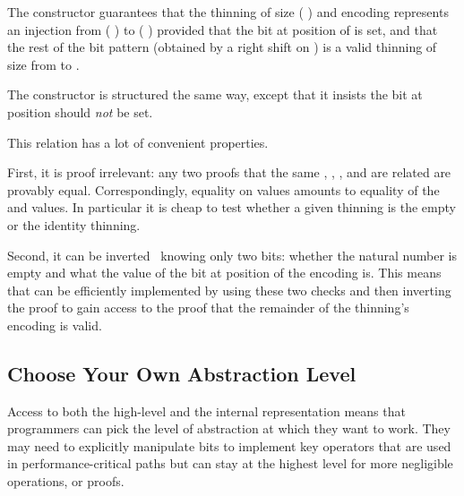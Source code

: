 The  constructor guarantees that the thinning of
size ( ) and encoding 
represents an injection
from ( \IdrisData{:<} )
to ( \IdrisData{:<} )
provided that the bit at position  of 
is set, and that the rest of the bit pattern (obtained by a right shift
on ) is a valid thinning of size  from
 to .

The  constructor is structured the same way, except that
it insists the bit at position  should \emph{not} be set.


This relation has a lot of convenient properties.

First, it is proof irrelevant: any two proofs that the same
, , , and  are
related are provably equal.
%
Correspondingly, equality on  values amounts to equality of
the  and  values. In particular
it is cheap to test whether a given thinning is the empty or the
identity thinning.

Second, it can be inverted~\cite{DBLP:conf/types/CornesT95} knowing only two bits:
whether the natural number is empty and what the value of the bit at position
 of the encoding is.
%
This means that  can be efficiently implemented by using
these two checks and then inverting the  proof to gain access
to the proof that the remainder of the thinning's encoding is valid.


\subsection{Choose Your Own Abstraction Level}

Access to both the high-level  and the internal 
representation means that programmers can pick the level of abstraction at which they
want to work.
%
They may need to explicitly manipulate bits to implement key operators that are used
in performance-critical paths but can stay at the highest level for more negligible
operations, or proofs.


